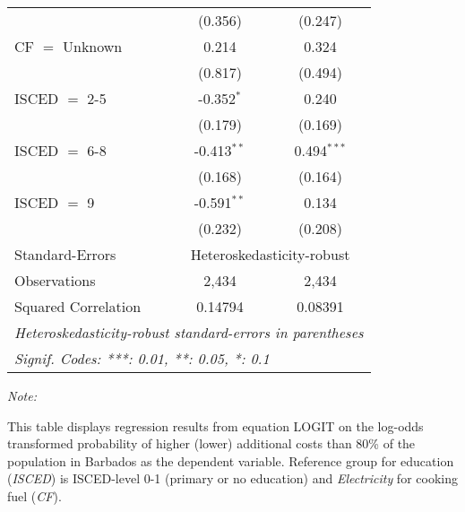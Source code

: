 \begin{table}[htbp!]
\begin{adjustbox}{width = 1\textwidth, max height = 0.95\textheight, center}
\begin{threeparttable}[b]
\begin{tabular}{lcc}
                                 & (0.356)       & (0.247)\\   
            CF $=$ Unknown       & 0.214         & 0.324\\   
                                 & (0.817)       & (0.494)\\   
            ISCED $=$ 2-5        & -0.352$^{*}$  & 0.240\\   
                                 & (0.179)       & (0.169)\\   
            ISCED $=$ 6-8        & -0.413$^{**}$ & 0.494$^{***}$\\   
                                 & (0.168)       & (0.164)\\   
            ISCED $=$ 9          & -0.591$^{**}$ & 0.134\\   
                                 & (0.232)       & (0.208)\\   
            \midrule 
            Standard-Errors & \multicolumn{2}{c}{Heteroskedasticity-robust} \\ 
            Observations         & 2,434         & 2,434\\  
            Squared Correlation  & 0.14794       & 0.08391\\  
            \midrule \midrule
            \multicolumn{3}{l}{\emph{Heteroskedasticity-robust standard-errors in parentheses}}\\
            \multicolumn{3}{l}{\emph{Signif. Codes: ***: 0.01, **: 0.05, *: 0.1}}\\
         \end{tabular}
         
         \begin{tablenotes}\item \medskip \textit{Note:}
            \item This table displays regression results from equation LOGIT on the log-odds transformed probability of higher (lower) additional costs than 80\% of the population in Barbados as the dependent variable. Reference group for education (\textit{ISCED}) is ISCED-level 0-1 (primary or no education) and \textit{Electricity} for cooking fuel (\textit{CF}).
         \end{tablenotes}
      \end{threeparttable}
   \end{adjustbox}
\end{table}


